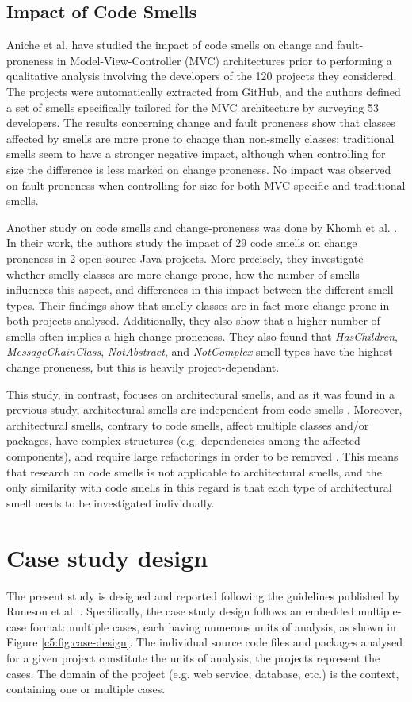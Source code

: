 \subsection{Impact of Code Smells}
Aniche et al. \cite{Aniche2018} have studied the impact of code smells on change and fault-proneness in Model-View-Controller (MVC) architectures prior to performing a qualitative analysis involving the developers of the 120 projects they considered.
The projects were automatically extracted from GitHub, and the authors defined a set of smells specifically tailored for the MVC architecture by surveying 53 developers.
The results concerning change and fault proneness show that classes affected by smells are more prone to change than non-smelly classes; traditional smells seem to have a stronger negative impact, although when controlling for size the difference is less marked on change proneness.
No impact was observed on fault proneness when controlling for size for both MVC-specific and traditional smells.

Another study on code smells and change-proneness was done by Khomh et al. \cite{Khomh2009}. In their work, the authors study the impact of 29 code smells on change proneness in 2 open source Java projects.
More precisely, they investigate whether smelly classes are more change-prone, how the number of smells influences this aspect, and differences in this impact between the different smell types.
Their findings show that smelly classes are in fact more change prone in both projects analysed. Additionally, they also show that a higher number of smells often implies a high change proneness. They also found that \emph{HasChildren}, \emph{MessageChainClass}, \emph{NotAbstract}, and \emph{NotComplex} smell types have the highest change proneness, but this is heavily project-dependant.

This study, in contrast, focuses on architectural smells, and as it was found in a previous study, architectural smells are independent from code smells \cite{Arcelli2019}.
Moreover, architectural smells, contrary to code smells, affect multiple classes and/or packages, have complex structures (e.g. dependencies among the affected components), and require large refactorings in order to be removed \cite{Lippert2006}.
This means that research on code smells is not applicable to architectural smells, and the only similarity with code smells in this regard is that each type of architectural smell needs to be investigated individually.


\section{Case study design}\label{c5:sec:design}
The present study is designed and reported following the guidelines published by Runeson et al. \cite{Runeson2012}.
Specifically, the case study design follows an embedded multiple-case format: multiple cases, each having numerous units of analysis, as shown in Figure \ref{c5:fig:case-design}.
The individual source code files and packages analysed for a given project constitute the units of analysis; the projects represent the cases.
The domain of the project (e.g. web service, database, etc.) is the context, containing one or multiple cases.

